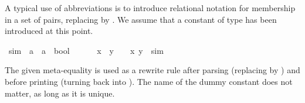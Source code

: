 \begin{isabellebody}
\begin{isamarkuptext}
A typical use of abbreviations is to introduce relational notation for
membership in a set of pairs, replacing  by
. We assume that a constant  of type
 has been introduced at this point.%
\end{isamarkuptext}%
\isamarkuptrue%
\isamarkupfalse%
\ sim{}\ {}{}\ {}{}a\ {}\ {}a\ {}\ bool{}\ \ \ {}\ {}{}{}\ {}{}{}\isanewline
{}\ {}x\ {}\ y\ \ {}\ \ {}x{}\ y{}\ {}\ sim{}%
\begin{isamarkuptext}%
\noindent The given meta-equality is used as a rewrite rule
after parsing (replacing \mbox{} by ) and before printing (turning  back into
\mbox{}). The name of the dummy constant 
does not matter, as long as it is unique.


\end{isamarkuptext}
\end{isabellebody}
